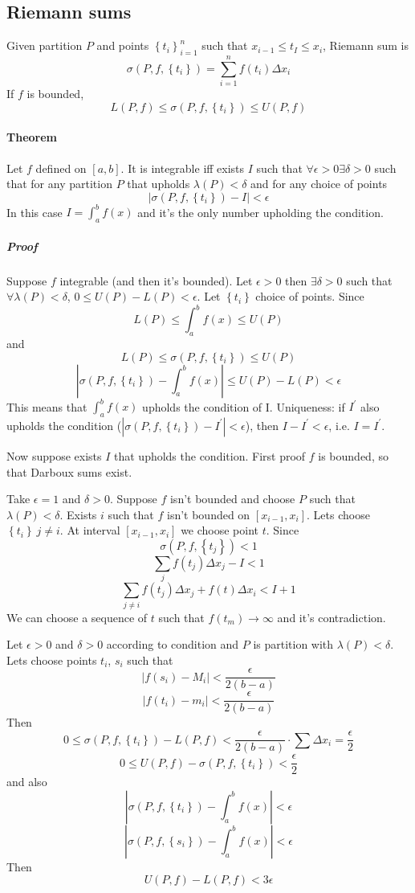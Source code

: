 \subsection{Riemann sums}
Given partition $P$ and points $\left\{t_i\right\}_{i=1}^n$ such that $x_{i-1} \leq t_I \leq x_i$, Riemann sum is
$$\sigma\left(P,f,\left\{t_i\right\}\right) = \sum_{i=1}^n f(t_i) \Delta x_i$$
If $f$ is bounded, $$L(P,f)\leq \sigma\left(P,f,\left\{t_i\right\}\right) \leq U(P,f)$$
\paragraph{Theorem} Let $f$ defined on $[a,b]$. It is integrable iff exists $I$ such that $\forall \epsilon > 0 \exists \delta > 0 $ such that for any partition $P$ that upholds $\lambda(P) < \delta$ and for any choice of points $$\left| \sigma\left(P,f,\left\{t_i\right\}\right) - I \right| < \epsilon $$
In this case $I  = \int_a^b f(x) $ and it's the only number upholding the condition.
\subparagraph{Proof}
Suppose $f$ integrable (and then it's bounded). Let $\epsilon > 0$ then $\exists \delta > 0$ such that $\forall \lambda(P) < \delta$, $0 \leq U(P) - L(P) < \epsilon$. Let $\left\{t_i\right\}$ choice of points. Since $$L(P) \leq \int_a^b f(x)  \leq U(P)$$ and $$L(P) \leq \sigma\left(P,f,\left\{t_i\right\}\right) \leq U(P)$$
$$\left| \sigma\left(P,f,\left\{t_i\right\}\right) -  \int_a^b f(x)  \right| \leq U(P) - L(P) < \epsilon$$
This means that $\int_a^b f(x)  $ upholds the condition of I.
Uniqueness: if $I^\prime$ also upholds the condition ($\left| \sigma\left(P,f,\left\{t_i\right\}\right) - I^\prime \right| < \epsilon $), then $I-I^\prime < \epsilon$, i.e. $I=I^\prime$.

Now suppose exists $I$ that upholds the condition. First proof $f$ is bounded, so that Darboux sums exist.

Take $\epsilon=1$ and $\delta > 0 $. Suppose $f$ isn't bounded and choose $P$ such that $\lambda(P) < \delta$. Exists $i$ such that $f$ isn't bounded on $\left[x_{i-1}, x_i\right]$. Lets choose $\left\{t_i\right\} \: j \neq i$. At interval $\left[x_{i-1}, x_i\right]$ we choose point $t$. Since $$\sigma\left(P,f,\left\{ t_j \right\}\right) < 1$$
$$\sum_j f(t_j) \Delta x_j - I < 1$$
$$\sum_{j\neq i} f(t_j) \Delta x_j + f(t) \Delta x_i < I + 1$$
We can choose a sequence of $t$ such that $f(t_m) \to \infty$ and it's contradiction.

Let $\epsilon > 0$ and $\delta > 0$ according to condition and $P$ is partition with $\lambda(P) < \delta$. Lets choose points $t_i$, $s_i$ such that 
$$\left|f(s_i) - M_i\right| < \frac{\epsilon}{2(b-a)}$$
$$\left|f(t_i) - m_i\right| < \frac{\epsilon}{2(b-a)}$$
Then
$$0 \leq \sigma\left( P, f, \left\{t_i \right\} \right) - L(P,f) < \frac{\epsilon}{2(b-a)} \cdot \sum \Delta x_i = \frac{\epsilon}{2}$$
$$0 \leq U(P,f) - \sigma\left( P, f, \left\{t_i \right\} \right)  < \frac{\epsilon}{2}$$
and also
$$\left| \sigma\left(P,f,\left\{t_i\right\}\right) -  \int_a^b f(x)  \right|  < \epsilon$$
$$\left| \sigma\left(P,f,\left\{s_i\right\}\right) -  \int_a^b f(x)  \right|  < \epsilon$$
Then
$$U(P,f)-L(P,f) < 3 \epsilon$$

